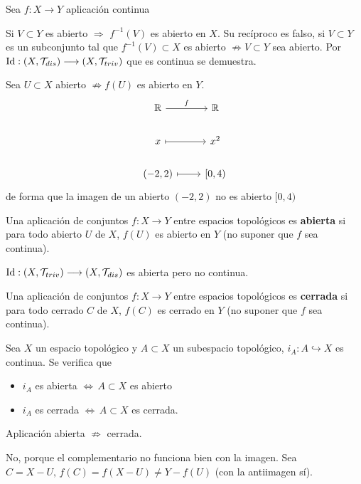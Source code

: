 Sea $f: X\longrightarrow Y$ aplicaci\'on continua
\begin{propis}
[NO] Si $V \subset Y$ es abierto $\Rightarrow$ $f^{-1}(V)$ es abierto en $X$. Su rec\'iproco es falso, si $V\subset Y$ es un subconjunto tal que $f^{-1}(V) \subset X$ es abierto $\not\Rightarrow V \subset Y$ sea abierto. Por $\text{Id}: (X, \mathcal{T}_{dis}) \longrightarrow (X, \mathcal{T}_{triv})$ que es continua se demuestra. 

Sea $U\subset X$ abierto $\not\Rightarrow f(U)$ es abierto en $Y$. 
$$\bt \bb R \rar{f} & \bb R \\ x \rarmaps & x^2 \\ (-2,2) \rarmaps & \left[0,4\right) \et$$
de forma que la imagen de un abierto $(-2,2)$ no es abierto $[0,4)$
\end{propis}
\begin{defi}
    Una aplicaci\'on de conjuntos $f : X \longrightarrow Y$ entre espacios topol\'ogicos es \textbf{abierta} si para todo abierto $U$ de $X$, $f(U)$ es abierto en $Y$ (no suponer que $f$ sea continua).
\end{defi}
\begin{ejem}
    $\text{Id}: (X, \mathcal{T}_{triv}) \longrightarrow (X, \mathcal{T}_{dis})$ es abierta pero no continua.
\end{ejem}
\begin{defi}
Una aplicaci\'on de conjuntos $f : X \longrightarrow Y$ entre espacios topol\'ogicos es \textbf{cerrada} si para todo cerrado $C$ de $X$, $f(C)$ es cerrado en $Y$ (no suponer que $f$ sea continua).
\end{defi}
\begin{ejer}
    Sea $X$ un espacio topol\'ogico y $A\subset X$ un subespacio topol\'ogico, $i_A: A \hookrightarrow X$ es continua. Se verifica que 
    \begin{itemize}
        \item $i_A$ es abierta $\iff \, A \subset X$ es abierto
        \item $i_A$ es cerrada $\iff \, A \subset X$ es cerrada. 
    \end{itemize}    
\end{ejer}

\begin{ejer}
    Aplicaci\'on abierta $\not\Rightarrow$ cerrada. 
\end{ejer}
\begin{sol}
    No, porque el complementario no funciona bien con la imagen. Sea $C = X-U, \, f(C) = f(X-U) \neq Y - f(U)$ (con la antiimagen s\'i).
\end{sol}


